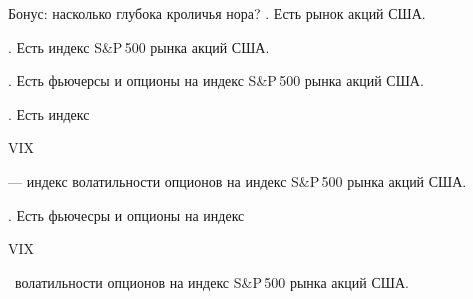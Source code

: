 \documentclass{beamer}
\newcommand{\en}[1]{\begin{otherlanguage}{english}#1\end{otherlanguage}}
\begin{document}
\begin{frame}{Бонус: насколько глубока кроличья нора?}
. Есть рынок акций США.

. Есть индекс S\&P\,500 рынка акций США.

. Есть фьючерсы и опционы на индекс S\&P\,500 рынка акций США.

. Есть индекс \en{VIX} --- индекс волатильности опционов на индекс S\&P\,500 рынка акций США.

. Есть фьючесры и опционы на индекс \en{VIX}\ волатильности опционов на индекс S\&P\,500 рынка акций США.
\end{frame}
\end{document}
